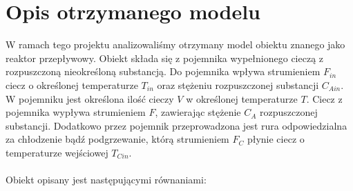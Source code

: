 \chapter{Opis otrzymanego modelu}

W ramach tego projektu analizowaliśmy otrzymany model obiektu znanego jako reaktor przepływowy. Obiekt składa się z pojemnika wypełnionego cieczą z rozpuszczoną nieokreśloną substancją. Do pojemnika wpływa strumieniem $F_{in}$ ciecz o określonej temperaturze $T_{in}$ oraz stężeniu rozpuszczonej substancji $C_{Ain}$. W pojemniku jest określona ilość cieczy $V$ w określonej temperaturze $T$. Ciecz z pojemnika wypływa strumieniem $F$, zawierając stężenie $C_A$ rozpuszczonej substancji. Dodatkowo przez pojemnik przeprowadzona jest rura odpowiedzialna za chłodzenie bądź podgrzewanie, którą strumieniem $F_C$ płynie ciecz o temperaturze wejściowej $T_{Cin}$.\\\\ Obiekt opisany jest następującymi równaniami:

